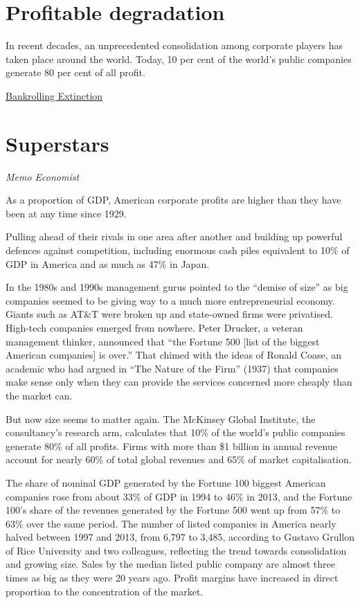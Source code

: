 \documentclass[
]{book}
\begin{document}
\hypertarget{profitable-degradation}{%
\section{Profitable degradation}\label{profitable-degradation}}

In recent decades, an unprecedented
consolidation among corporate players has
taken place around the world. Today, 10 per
cent of the world's public companies generate
80 per cent of all profit.

\href{https://portfolio.earth/campaigns/bankrolling-extinction/}{Bankrolling Extinction}

\hypertarget{superstars}{%
\section{Superstars}\label{superstars}}

\emph{Memo Economist}

As a proportion of GDP, American corporate profits are higher
than they have been at any time since 1929.

Pulling ahead of their rivals in one area after another and building up powerful defences against competition, including enormous cash piles equivalent to 10\% of GDP in America and as much as 47\% in Japan.

In the 1980s and 1990s management gurus pointed to the ``demise of size'' as big companies seemed to be giving way to a much more entrepreneurial economy.
Giants such as AT\&T were broken up and state-owned firms were privatised. High-tech companies emerged from nowhere. Peter Drucker, a veteran management thinker, announced that ``the Fortune 500 {[}list of the biggest American companies{]} is over.'' That chimed with the ideas of Ronald Coase, an academic who had argued in ``The Nature of the Firm'' (1937) that companies make sense only when they can provide the services concerned more cheaply than the market can.

But now size seems to matter again. The McKinsey Global Institute, the consultancy's research arm, calculates that 10\% of the world's public companies generate 80\% of all profits.
Firms with more than \$1 billion in annual revenue account for nearly 60\% of total global revenues and 65\% of market capitalisation.

The share of nominal GDP generated by the Fortune 100 biggest American companies rose from about 33\% of GDP in 1994 to 46\% in 2013, and the Fortune 100's share of the revenues generated by the Fortune 500 went up from 57\% to 63\% over the same period. The number of listed companies in America nearly halved between 1997 and 2013, from 6,797 to 3,485, according to Gustavo Grullon of Rice University and two colleagues, reflecting the trend towards consolidation and growing size. Sales by the median listed public company are almost three times as big as they were 20 years ago. Profit margins have increased in direct proportion to the concentration of the market.
\end{document}
